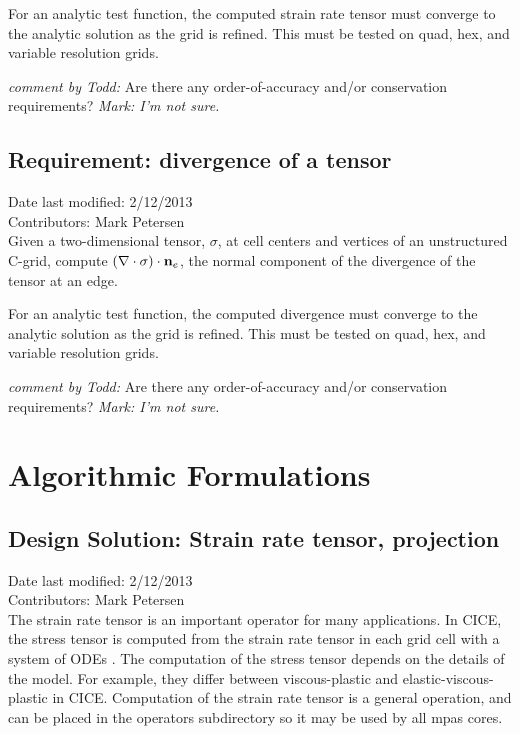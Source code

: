 \documentclass[11pt]{report}
\begin{document}
For an analytic test function, the computed strain rate tensor must converge to the analytic solution as the grid is refined.  This must be tested on quad, hex, and variable resolution grids.

{\it comment by Todd:} Are there any order-of-accuracy and/or conservation requirements? {\it Mark: I'm not sure.}

\section{Requirement: divergence of a tensor}
Date last modified: 2/12/2013 \\
Contributors: Mark Petersen \\

Given a two-dimensional tensor, $\sigma$, at cell centers and vertices of an unstructured C-grid, compute $(\nabla\cdot\sigma)\cdot{\bf n}_e$, the normal component of the divergence of the tensor at an edge.

For an analytic test function, the computed divergence must converge to the analytic solution as the grid is refined.  This must be tested on quad, hex, and variable resolution grids.

{\it comment by Todd:} Are there any order-of-accuracy and/or conservation requirements? {\it Mark: I'm not sure.}



\chapter{Algorithmic Formulations}

\section{Design Solution: Strain rate tensor, projection}
Date last modified: 2/12/2013 \\
Contributors: Mark Petersen \\

The strain rate tensor is an important operator for many applications.  In CICE, the stress tensor is computed from the strain rate tensor in each grid cell with a system of ODEs \cite[section 3.4]{CICE_manual_4.1}.  The computation of the stress tensor depends on the details of the model.  For example, they differ between viscous-plastic and elastic-viscous-plastic in CICE.  Computation of the strain rate tensor is a general operation, and can be placed in the operators subdirectory so it may be used by all mpas cores.
\end{document}
